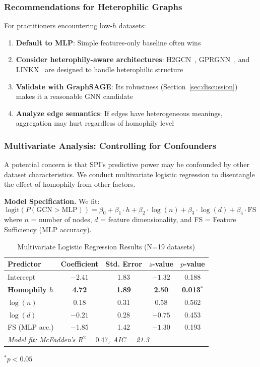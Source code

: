 \subsubsection{Recommendations for Heterophilic Graphs}

For practitioners encountering low-$h$ datasets:
\begin{enumerate}
    \item \textbf{Default to MLP}: Simple features-only baseline often wins
    \item \textbf{Consider heterophily-aware architectures}: H2GCN~\cite{zhu2020beyond}, GPRGNN~\cite{chien2021gprgnn}, and LINKX~\cite{lim2021large} are designed to handle heterophilic structure
    \item \textbf{Validate with GraphSAGE}: Its robustness (Section~\ref{sec:discussion}) makes it a reasonable GNN candidate
    \item \textbf{Analyze edge semantics}: If edges have heterogeneous meanings, aggregation may hurt regardless of homophily level
\end{enumerate}

\subsubsection{Multivariate Analysis: Controlling for Confounders}

A potential concern is that SPI's predictive power may be confounded by other dataset characteristics. We conduct multivariate logistic regression to disentangle the effect of homophily from other factors.

\textbf{Model Specification.} We fit:
\begin{equation}
    \text{logit}(P(\text{GCN} > \text{MLP})) = \beta_0 + \beta_1 \cdot h + \beta_2 \cdot \log(n) + \beta_3 \cdot \log(d) + \beta_4 \cdot \text{FS}
\end{equation}
where $n$ = number of nodes, $d$ = feature dimensionality, and FS = Feature Sufficiency (MLP accuracy).

\begin{table}[h]
\centering
\caption{Multivariate Logistic Regression Results (N=19 datasets)}
\label{tab:multivariate}
\small
\begin{tabular}{@{}lcccc@{}}
\toprule
\textbf{Predictor} & \textbf{Coefficient} & \textbf{Std. Error} & \textbf{$z$-value} & \textbf{$p$-value} \\
\midrule
Intercept & $-2.41$ & 1.83 & $-1.32$ & 0.188 \\
\textbf{Homophily $h$} & \textbf{4.72} & \textbf{1.89} & \textbf{2.50} & \textbf{0.013$^*$} \\
$\log(n)$ & 0.18 & 0.31 & 0.58 & 0.562 \\
$\log(d)$ & $-0.21$ & 0.28 & $-0.75$ & 0.453 \\
FS (MLP acc.) & $-1.85$ & 1.42 & $-1.30$ & 0.193 \\
\midrule
\multicolumn{5}{l}{\textit{Model fit: McFadden's $R^2 = 0.47$, AIC = 21.3}} \\
\bottomrule
\end{tabular}
\vspace{1mm}
\raggedright\small $^*p < 0.05$
\end{table}

